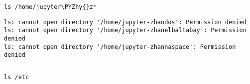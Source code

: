 \documentclass[11pt]{article}
\makeatletter
\def\PYZhy{\char`\-}
\newcommand{\boxspacing}{\kern\kvtcb@left@rule\kern\kvtcb@boxsep}
\newcommand{\prompt}[4]{
        \ttfamily\llap{{\color{#2}[#3]:\hspace{3pt}#4}}\vspace{-\baselineskip}
    }
\makeatother
\begin{document}
    \begin{tcolorbox}[breakable, size=fbox, boxrule=1pt, pad at break*=1mm,colback=cellbackground, colframe=cellborder]
\prompt{In}{incolor}{70}{\boxspacing}
\begin{Verbatim}[commandchars=\\\{\}]
ls /home/jupyter\PYZhy{}z*
\end{Verbatim}
\end{tcolorbox}

    \begin{Verbatim}[commandchars=\\\{\}]
ls: cannot open directory '/home/jupyter-zhandos': Permission denied
ls: cannot open directory '/home/jupyter-zhanelbaltabay': Permission denied
ls: cannot open directory '/home/jupyter-zhannaspace': Permission denied
    \end{Verbatim}

    \begin{Verbatim}[commandchars=\\\{\}]

    \end{Verbatim}

    \begin{tcolorbox}[breakable, size=fbox, boxrule=1pt, pad at break*=1mm,colback=cellbackground, colframe=cellborder]
\prompt{In}{incolor}{71}{\boxspacing}
\begin{Verbatim}[commandchars=\\\{\}]
ls /etc
\end{Verbatim}
\end{tcolorbox}
\end{document}

